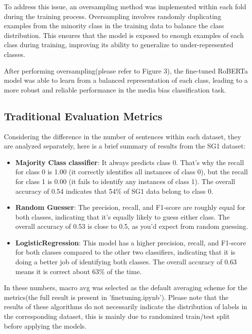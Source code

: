 \documentclass[11pt,a4paper]{article}
\begin{document}
To address this issue, an oversampling method was implemented within each fold during the training process. Oversampling involves randomly duplicating examples from the minority class in the training data to balance the class distribution. This ensures that the model is exposed to enough examples of each class during training, improving its ability to generalize to under-represented classes.

After performing oversampling(please refer to Figure 3), the fine-tuned RoBERTa model was able to learn from a balanced representation of each class, leading to a more robust and reliable performance in the media bias classification task.
\subsection{Traditional Evaluation Metrics}
Considering the difference in the number of sentences within each dataset, they are analyzed separately, here is a brief summary of results from the SG1 dataset:
\begin{itemize}
    \item \textbf{Majority Class classifier}: It always predicts class 0. That’s why the recall for class 0 is 1.00 (it correctly identifies all instances of class 0), but the recall for class 1 is 0.00 (it fails to identify any instances of class 1). The overall accuracy of 0.54 indicates that 54\% of SG1 data belong to class 0.
    \item \textbf{Random Guesser}:  The precision, recall, and F1-score are roughly equal for both classes, indicating that it’s equally likely to guess either class. The overall accuracy of 0.53 is close to 0.5, as you’d expect from random guessing. 
    \item \textbf{LogisticRegression}: This model has a higher precision, recall, and F1-score for both classes compared to the other two classifiers, indicating that it is doing a better job of identifying both classes. The overall accuracy of 0.63 means it is correct about 63\% of the time.
\end{itemize}
In these numbers, macro avg was selected as the default averaging scheme for the metrics(the full result is present in {'finetuning.ipynb'}). Please note that the results of these algorithms do not necessarily indicate the distribution of labels in the corresponding dataset, this is mainly due to randomized train/test split before applying the models.
\end{document}
